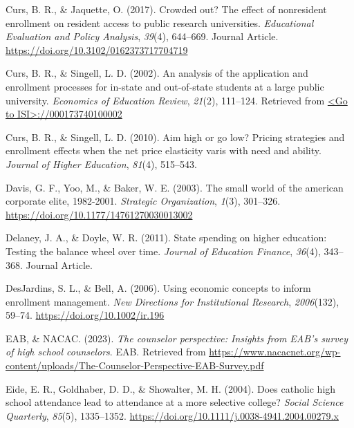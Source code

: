 \documentclass[
  12pt,
]{article}
\newlength{\cslhangindent}
\newlength{\cslentryspacingunit} %
\newenvironment{CSLReferences}[2] %
 {%
  \setlength{\parindent}{0pt}
  \ifodd #1
  \let\oldpar\par
  \def\par{\hangindent=\cslhangindent\oldpar}
  \fi
  \setlength{\parskip}{#2\cslentryspacingunit}
 }%
 {}
\begin{document}
\begin{CSLReferences}{1}{0}
\leavevmode{}%
Curs, B. R., \& Jaquette, O. (2017). Crowded out? The effect of nonresident enrollment on resident access to public research universities. \emph{Educational Evaluation and Policy Analysis}, \emph{39}(4), 644--669. Journal Article. \url{https://doi.org/10.3102/0162373717704719}

\leavevmode{}%
Curs, B. R., \& Singell, L. D. (2002). An analysis of the application and enrollment processes for in-state and out-of-state students at a large public university. \emph{Economics of Education Review}, \emph{21}(2), 111--124. Retrieved from \href{\%3CGo\%20to\%20ISI\%3E://000173740100002}{\textless Go to ISI\textgreater://000173740100002}

\leavevmode{}%
Curs, B. R., \& Singell, L. D. (2010). Aim high or go low? Pricing strategies and enrollment effects when the net price elasticity varis with need and ability. \emph{Journal of Higher Education}, \emph{81}(4), 515--543.

\leavevmode{}%
Davis, G. F., Yoo, M., \& Baker, W. E. (2003). The small world of the american corporate elite, 1982-2001. \emph{Strategic Organization}, \emph{1}(3), 301--326. \url{https://doi.org/10.1177/14761270030013002}

\leavevmode{}%
Delaney, J. A., \& Doyle, W. R. (2011). State spending on higher education: Testing the balance wheel over time. \emph{Journal of Education Finance}, \emph{36}(4), 343--368. Journal Article.

\leavevmode{}%
DesJardins, S. L., \& Bell, A. (2006). Using economic concepts to inform enrollment management. \emph{New Directions for Institutional Research}, \emph{2006}(132), 59--74. \url{https://doi.org/10.1002/ir.196}

\leavevmode{}%
EAB, \& NACAC. (2023). \emph{The counselor perspective: Insights from EAB's survey of high school counselors}. EAB. Retrieved from \url{https://www.nacacnet.org/wp-content/uploads/The-Counselor-Perspective-EAB-Survey.pdf}

\leavevmode{}%
Eide, E. R., Goldhaber, D. D., \& Showalter, M. H. (2004). Does catholic high school attendance lead to attendance at a more selective college? \emph{Social Science Quarterly}, \emph{85}(5), 1335--1352. \url{https://doi.org/10.1111/j.0038-4941.2004.00279.x}


\end{CSLReferences}
\end{document}
